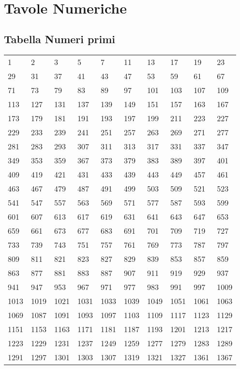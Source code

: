 \chapter{Tavole Numeriche}
\section{Tabella Numeri primi}
\label{sec:TabellaNumeriPrrimi}
\begin{center}
	\begin{tabular}{llllllllll}
1 &2 &3 &5 &7 &11 &13 &17 &19 &23 \\
29 &31 &37 &41 &43 &47 &53 &59 &61 &67 \\
71 &73 &79 &83 &89 &97 &101 &103 &107 &109 \\
113 &127 &131 &137 &139 &149 &151 &157 &163 &167 \\
173 &179 &181 &191 &193 &197 &199 &211 &223 &227 \\
229 &233 &239 &241 &251 &257 &263 &269 &271 &277 \\
281 &283 &293 &307 &311 &313 &317 &331 &337 &347 \\
349 &353 &359 &367 &373 &379 &383 &389 &397 &401 \\
409 &419 &421 &431 &433 &439 &443 &449 &457 &461 \\
463 &467 &479 &487 &491 &499 &503 &509 &521 &523 \\
541 &547 &557 &563 &569 &571 &577 &587 &593 &599 \\
601 &607 &613 &617 &619 &631 &641 &643 &647 &653 \\
659 &661 &673 &677 &683 &691 &701 &709 &719 &727 \\
733 &739 &743 &751 &757 &761 &769 &773 &787 &797 \\
809 &811 &821 &823 &827 &829 &839 &853 &857 &859 \\
863 &877 &881 &883 &887 &907 &911 &919 &929 &937 \\
941 &947 &953 &967 &971 &977 &983 &991 &997 &1009 \\
1013 &1019 &1021 &1031 &1033 &1039 &1049 &1051 &1061 &1063 \\
1069 &1087 &1091 &1093 &1097 &1103 &1109 &1117 &1123 &1129 \\
1151 &1153 &1163 &1171 &1181 &1187 &1193 &1201 &1213 &1217 \\
1223 &1229 &1231 &1237 &1249 &1259 &1277 &1279 &1283 &1289 \\
1291 &1297 &1301 &1303 &1307 &1319 &1321 &1327 &1361 &1367 \\

\end{tabular}
\end{center}
